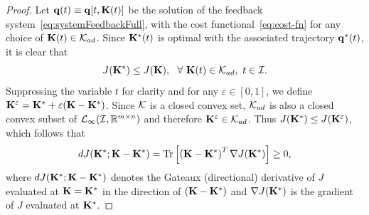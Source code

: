 \documentclass[
12pt,draftcls,onecolumn%
]{IEEEtran}
\begin{document}
\begin{proof}
Let ${\bf q}(t)\equiv{\bf q}[t,{\bf K}(t)]$ be the solution of the feedback system~\eqref{eq:systemFeedbackFull}, with the cost functional~\eqref{eq:cost-fn} for any choice of ${\bf K}(t)\in{\cal K}_{ad}$. Since ${\bf K}^*(t)$ is optimal with the associated trajectory ${\bf q}^*(t)$, it is clear that
\begin{equation*}
J({\bf K}^*) \leq J({\bf K}),~~\forall~{\bf K}(t)\in{\cal K}_{ad},~t\in {\cal I}. 
\end{equation*}
Suppressing the variable $t$ for clarity and for any $\varepsilon\in [0,1]$, we define ${\bf K}^{\varepsilon}={\bf K}^* + \varepsilon ({\bf K-K^*})$. Since ${\cal K}$ is a closed convex set, ${\cal K}_{ad}$ is also a closed convex subset of ${\cal L}_{\infty}({\cal I},\mathbb{R}^{m\times n})$ and therefore ${\bf K}^{\varepsilon}\in{\cal K}_{ad}$. Thus $J({\bf K^*}) \leq J({\bf K}^{\varepsilon})$, which follows that
\begin{equation}
dJ({\bf K}^*;{\bf K}-{\bf K}^*)=\mathrm{Tr}\left[\left({\bf K}-{\bf K}^*\right)^T\nabla J({\bf K}^*)\right]\geq 0,
\label{eq:dJ}
\end{equation}
where $dJ({\bf K}^*;{\bf K}-{\bf K}^*)$ denotes the Gateaux (directional) derivative of $J$ evaluated at ${\bf K}={\bf K}^*$ in the direction of $({\bf K}-{\bf K}^*)$ and $\nabla J({\bf K}^*)$ is the gradient of $J$ evaluated at ${\bf K}^*$. 


\end{proof}
\end{document}
